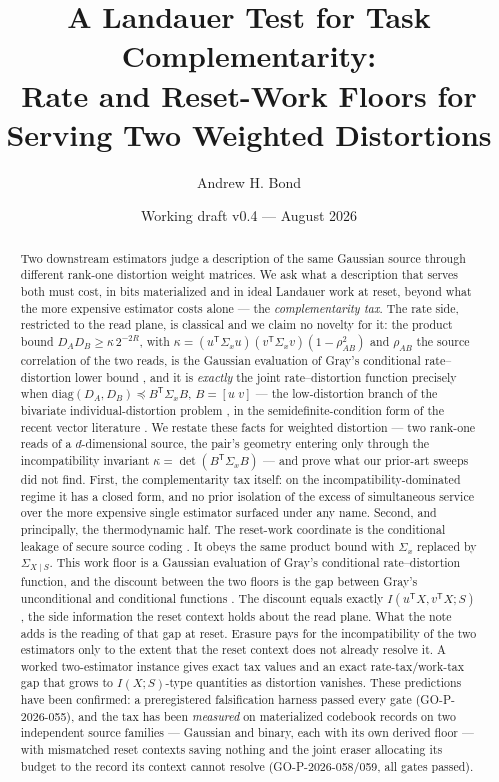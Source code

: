 \documentclass[11pt]{article}
\title{A Landauer Test for Task Complementarity:\\
Rate and Reset-Work Floors for Serving Two Weighted Distortions}
\author{Andrew H. Bond}
\date{Working draft v0.4 --- August 2026}
\begin{document}
\maketitle

\begin{abstract}
Two downstream estimators judge a description of the same Gaussian source
through different rank-one distortion weight matrices. We ask what a
description that serves both must cost, in bits materialized and in ideal
Landauer work at reset, beyond what the more expensive estimator costs alone --- the \emph{complementarity tax}. The rate
side, restricted to the read plane, is classical and we claim no novelty for
it: the product bound $D_A D_B \ge \kappa\,2^{-2R}$, with
$\kappa=(u^{\mathsf T}\Sigma_x u)(v^{\mathsf T}\Sigma_x v)(1-\rho_{AB}^2)$
and $\rho_{AB}$ the source correlation of the two reads, is the Gaussian
evaluation of Gray's conditional rate--distortion lower bound
\cite{gray1973}, and it is \emph{exactly} the joint rate--distortion
function precisely when $\mathrm{diag}(D_A,D_B)\preceq B^{\mathsf T}\Sigma_x
B$, $B=[u\;v]$ --- the low-distortion branch of the bivariate
individual-distortion problem \cite{xiaoluo2005,lapidothtinguely2010}, in
the semidefinite-condition form of the recent vector literature
\cite{stylianou2021,chen2026}. We restate these facts for weighted distortion
--- two rank-one reads of a $d$-dimensional source, the pair's geometry
entering only through the incompatibility invariant
$\kappa=\det(B^{\mathsf T}\Sigma_xB)$ --- and prove what our prior-art
sweeps did not find. First, the complementarity tax itself: on the
incompatibility-dominated regime it has a closed form, and no prior
isolation of the excess of simultaneous service over the more expensive
single estimator surfaced under any name. Second, and principally, the
thermodynamic half. The reset-work coordinate is the conditional leakage of
secure source coding \cite{villard2013,ekrem2013}. It obeys the same product
bound with $\Sigma_x$ replaced by $\Sigma_{X\mid S}$. This work floor is a
Gaussian evaluation of Gray's conditional rate--distortion function, and the
discount between the two floors is the gap between Gray's unconditional and
conditional functions \cite{gray1973}. The discount equals exactly
$I(u^{\mathsf T}X, v^{\mathsf T}X; S)$, the side information the
reset context holds about the read plane. What the note adds is the reading
of that gap at reset.
Erasure pays for the incompatibility of the two estimators only to the extent
that the reset context does not already resolve it. A worked two-estimator
instance gives
exact tax values and an exact rate-tax/work-tax gap that grows to
$I(X;S)$-type quantities as distortion vanishes. These predictions have
been confirmed: a preregistered falsification harness passed every gate
(GO-P-2026-055), and the tax has been \emph{measured} on materialized
codebook records on two independent source families --- Gaussian and binary,
each with its own derived floor --- with mismatched reset contexts saving
nothing and the joint eraser allocating its budget to the record its
context cannot resolve (GO-P-2026-058/059, all gates passed).
\end{abstract}
\end{document}
